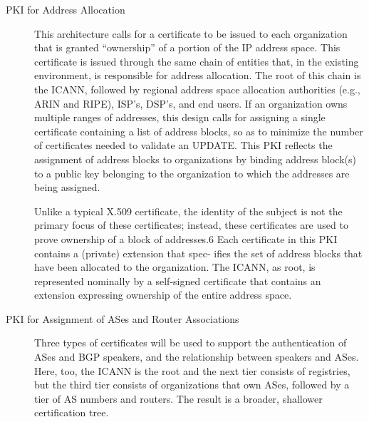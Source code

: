\documentclass[12pt]{article}
\begin{document}
\begin{description}
\item[PKI for Address Allocation]
This architecture calls for
a certificate to be issued to each organization that is granted
“ownership” of a portion of the IP address space. This certificate
is issued through the same chain of entities that, in the existing
environment, is responsible for address allocation. The root of
this chain is the ICANN, followed by regional address space
allocation authorities (e.g., ARIN and RIPE), ISP’s, DSP’s, and
end users. If an organization owns multiple ranges of addresses, this design calls
for assigning a single certificate
containing a list of address
blocks, so as to minimize the number of certificates needed to
validate an UPDATE.
This PKI reflects the assignment of address blocks to organizations by binding address block(s) to a public key belonging
to the organization to which the addresses are being assigned.

Unlike a typical X.509 certificate, the identity of the subject is
not the primary focus of these certificates; instead, these certificates are used to prove ownership of a block of addresses.6
Each
certificate in this PKI contains a (private) extension that spec-
ifies the set of address blocks that have been allocated to the
organization.
The ICANN, as root, is represented nominally by a self-signed
certificate that contains an extension expressing ownership of
the entire address space.

\item[PKI for Assignment of ASes and Router Associations]
Three types of certificates will be used to support the
authentication of ASes and BGP speakers, and the relationship 
between speakers and ASes. Here, too, the ICANN is the root
and the next tier consists of registries, but the third tier consists
of organizations that own ASes, followed by a tier of AS numbers and routers. The result is a broader, shallower certification
tree. 


\end{description}
\end{document}
